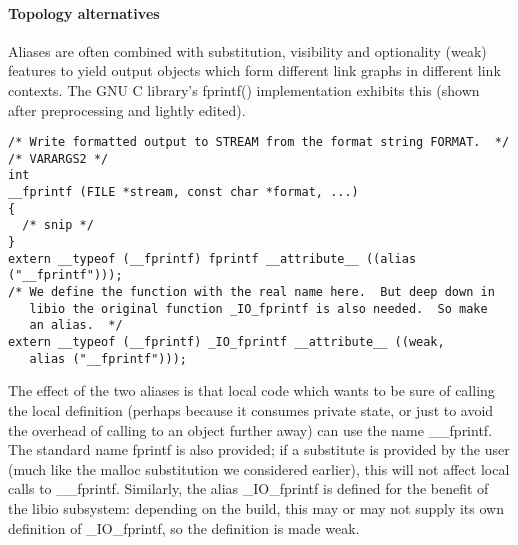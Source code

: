 \paragraph{Topology alternatives}
Aliases are often combined with substitution, visibility and optionality (weak) features 
to yield output objects which 
form different link graphs in different link contexts.
The GNU C library's \textsf{fprintf()} implementation
exhibits this (shown after preprocessing and lightly edited).

{\scriptsize\begin{lstlisting}
/* Write formatted output to STREAM from the format string FORMAT.  */
/* VARARGS2 */
int
__fprintf (FILE *stream, const char *format, ...)
{
  /* snip */
}
extern __typeof (__fprintf) fprintf __attribute__ ((alias ("__fprintf")));
/* We define the function with the real name here.  But deep down in
   libio the original function _IO_fprintf is also needed.  So make
   an alias.  */
extern __typeof (__fprintf) _IO_fprintf __attribute__ ((weak, 
   alias ("__fprintf")));
\end{lstlisting}}

The effect of the two aliases is that
local code which wants to be sure of calling the local definition
(perhaps because it consumes private state, or just to avoid the overhead 
of calling to an object further away) 
can use the name \textsf{\_\_fprintf}.
The standard name \textsf{fprintf} is also provided;
if a substitute is provided by the user 
(much like the \textsf{malloc} substitution we considered earlier),
this will not affect local calls to \textsf{\_\_fprintf}.
Similarly, the alias \textsf{\_IO\_fprintf} is defined
for the benefit of the \textsf{libio} subsystem: 
depending on the build,
this may or may not supply its own definition of \textsf{\_IO\_fprintf},
so the definition is made weak.

